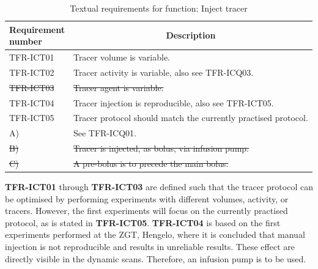 \begin{table}[H]
\caption{Textual requirements for function: Inject tracer}
\label{tab:injtrac_text}
\begin{tabular}{l|p{115mm}|}
	\makecell[l]{\textbf{Requirement} \\  \textbf{number}} & \multicolumn{1}{c}{\textbf{Description}} \\
	\hline
	TFR-ICT01 			& Tracer volume is variable. \\
	TFR-ICT02			& Tracer activity is variable, also see TFR-ICQ03. \\
	\sout{TFR-ICT03}			& \sout{Tracer agent is variable.} \\
	TFR-ICT04 			& Tracer injection is reproducible, also see TFR-ICT05.\\
	TFR-ICT05 			& Tracer protocol should match the currently practised protocol. \\
	\hspace{1.5cm} A) 	& See TFR-ICQ01. \\
	\hspace{1.5cm} \sout{B)} 	& \sout{Tracer is injected, as bolus, via infusion pump.} \\
	\hspace{1.5cm} \sout{C)} 	& \sout{A pre-bolus is to precede the main bolus.} \\
	\cline{2-2}
\end{tabular}
\end{table}

\textbf{TFR-ICT01} through \textbf{TFR-ICT03} are defined such that the tracer protocol can be optimised by performing experiments with different volumes, activity, or tracers. However, the first experiments will focus on the currently practised protocol, as is stated in \textbf{TFR-ICT05}. \textbf{TFR-ICT04} is based on the first experiments performed at the ZGT, Hengelo, where it is concluded that manual injection is not reproducible and results in unreliable results. These effect are directly visible in the dynamic scans. Therefore, an infusion pump is to be used.

